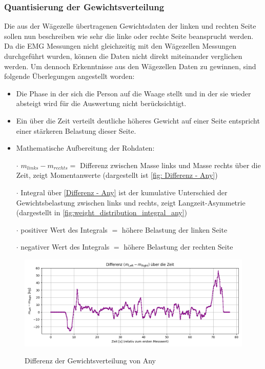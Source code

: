 \subsubsection{Quantisierung der Gewichtsverteilung}
Die aus der Wägezelle übertragenen Gewichtsdaten der linken und rechten Seite sollen nun beschreiben wie sehr die linke oder rechte Seite beansprucht werden.
Da die EMG Messungen nicht gleichzeitig mit den Wägezellen Messungen durchgeführt wurden, können die Daten nicht direkt miteinander verglichen werden.
Um dennoch Erkenntnisse aus den Wägezellen Daten zu gewinnen, sind folgende Überlegungen angestellt worden:
\begin{itemize}
  \item Die Phase in der sich die Person auf die Waage stellt und in der sie wieder absteigt wird für die Auswertung nicht berücksichtigt.
  \item Ein über die Zeit verteilt deutliche höheres Gewicht auf einer Seite entspricht einer stärkeren Belastung dieser Seite.
  \item Mathematische Aufbereitung der Rohdaten: 
    \item[$\cdot$] $m_{links} - m_{rechts} =$ Differenz zwischen Masse links und Masse rechts über die Zeit, zeigt Momentanwerte (dargestellt ist \autoref{fig: Differenz - Any})
    \item[$\cdot$] Integral über \autoref{Differenz - Any} ist der kumulative Unterschied der Gewichtsbelastung zwischen links und rechts, zeigt Langzeit-Asymmetrie (dargestellt in \autoref{fig:weight_distribution_integral_any})
    \item[$\cdot$] positiver Wert des Integrals $=$ höhere Belastung der linken Seite
    \item[$\cdot$] negativer Wert des Integrals $=$ höhere Belastung der rechten Seite 
\end{itemize}

\begin{figure}
  \centering
  \includegraphics[width=0.8\linewidth]{img/pyplots/Differenz - Any.png}\\
  \caption{Differenz der Gewichtsverteilung von Any}
  \label{fig: Differenz - Any}
\end{figure}

